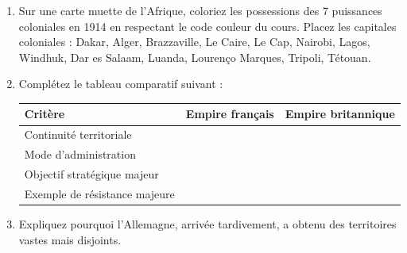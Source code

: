 \documentclass[11pt]{article}
\begin{document}
\begin{exercice}
\begin{enumerate}
    \item Sur une carte muette de l'Afrique, coloriez les possessions des 7 puissances coloniales en 1914 en respectant le code couleur du cours. Placez les capitales coloniales : Dakar, Alger, Brazzaville, Le Caire, Le Cap, Nairobi, Lagos, Windhuk, Dar es Salaam, Luanda, Lourenço Marques, Tripoli, Tétouan.
    \item Complétez le tableau comparatif suivant :
    \begin{center}
    \begin{tabularx}{\linewidth}{|l|X|X|}\hline
    \textbf{Critère} & \textbf{Empire français} & \textbf{Empire britannique} \\ \hline
    Continuité territoriale & & \\ \hline
    Mode d'administration & & \\ \hline
    Objectif stratégique majeur & & \\ \hline
    Exemple de résistance majeure & & \\ \hline
    \end{tabularx}
    \end{center}
    \item Expliquez pourquoi l'Allemagne, arrivée tardivement, a obtenu des territoires vastes mais disjoints.
\end{enumerate}
\end{exercice}
\end{document}
